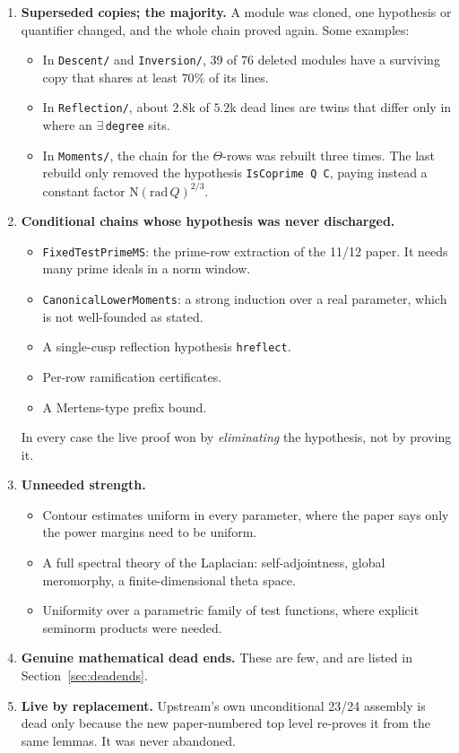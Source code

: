 \documentclass[11pt,a4paper]{article}
\newcommand{\lean}[1]{\nolinkurl{#1}}
\newcommand{\NK}{\mathrm N}
\begin{document}
\begin{enumerate}[label=\textbf{(\Alph*)}]
\item \textbf{Superseded copies; the majority.} A module was cloned, one hypothesis or quantifier
changed, and the whole chain proved again. Some examples:
\begin{itemize}
\item In \lean{Descent/} and \lean{Inversion/}, 39 of 76 deleted modules have a surviving copy
that shares at least $70\%$ of its lines.
\item In \lean{Reflection/}, about $2.8$k of $5.2$k dead lines are twins that differ only in where
an $\exists$\,\lean{degree} sits.
\item In \lean{Moments/}, the chain for the $\Theta$-rows was rebuilt three times. The last rebuild
only removed the hypothesis \lean{IsCoprime Q C}, paying instead a constant factor
$\NK(\mathrm{rad}\,Q)^{2/3}$.
\end{itemize}
\item \textbf{Conditional chains whose hypothesis was never discharged.}
\begin{itemize}
\item \lean{FixedTestPrimeMS}: the prime-row extraction of the 11/12 paper. It needs many prime
ideals in a norm window.
\item \lean{CanonicalLowerMoments}: a strong induction over a real parameter, which is not
well-founded as stated.
\item A single-cusp reflection hypothesis \lean{hreflect}.
\item Per-row ramification certificates.
\item A Mertens-type prefix bound.
\end{itemize}
In every case the live proof won by \emph{eliminating} the hypothesis, not by proving it.
\item \textbf{Unneeded strength.}
\begin{itemize}
\item Contour estimates uniform in every parameter, where the paper says only the power margins
need to be uniform.
\item A full spectral theory of the Laplacian: self-adjointness, global meromorphy, a
finite-dimensional theta space.
\item Uniformity over a parametric family of test functions, where explicit seminorm products were
needed.
\end{itemize}
\item \textbf{Genuine mathematical dead ends.} These are few, and are listed in
Section~\ref{sec:deadends}.
\item \textbf{Live by replacement.} Upstream's own unconditional 23/24 assembly is dead only
because the new paper-numbered top level re-proves it from the same lemmas. It was never abandoned.
\end{enumerate}
\end{document}
